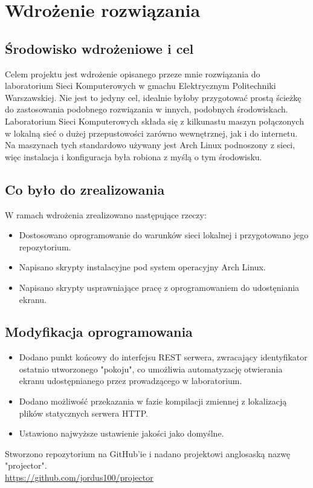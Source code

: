 \documentclass[a4paper,11pt]{article}
\begin{document}
    \section{Wdrożenie rozwiązania} 
        \subsection{Środowisko wdrożeniowe i cel}
        Celem projektu jest wdrożenie opisanego przeze mnie rozwiązania do laboratorium Sieci Komputerowych w gmachu Elektrycznym Politechniki Warszawskiej. 
        Nie jest to jedyny cel, idealnie byłoby przygotować prostą ścieżkę do zastosowania podobnego rozwiązania w innych, podobnych środowiskach.    
        Laboratorium Sieci Komputerowych składa się z kilkunastu maszyn połączonych w lokalną sieć o dużej przepustowości zarówno wewnętrznej, jak i do internetu.
        Na maszynach tych standardowo używany jest Arch Linux podnoszony z sieci, więc instalacja i konfiguracja była robiona z myślą o tym środowisku.  
        \subsection{Co było do zrealizowania}
        W ramach wdrożenia zrealizowano następujące rzeczy: 
        \begin{itemize}
            \item Dostosowano oprogramowanie do warunków sieci lokalnej i przygotowano jego repozytorium.
            \item Napisano skrypty instalacyjne pod system operacyjny Arch Linux.
            \item Napisano skrypty usprawniające pracę z oprogramowaniem do udostęniania ekranu.
        \end{itemize}
        \subsection{Modyfikacja oprogramowania}
        \begin{itemize}
            \item Dodano punkt końcowy do interfejsu REST serwera, zwracający identyfikator ostatnio utworzonego "pokoju", co umożliwia automatyzację otwierania ekranu udostępnianego przez prowadzącego w laboratorium.  
            \item Dodano możliwość przekazania w fazie kompilacji zmiennej z lokalizacją plików statycznych serwera HTTP.
            \item Ustawiono najwyższe ustawienie jakości jako domyślne. 
        \end{itemize}
        Stworzono repozytorium na GitHub'ie i nadano projektowi anglosaską nazwę "projector". \\
        \url{https://github.com/jordus100/projector}
\end{document}
